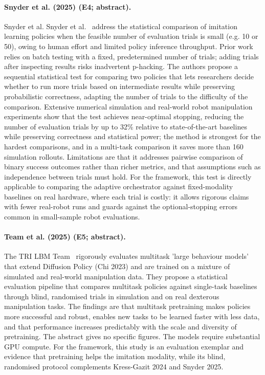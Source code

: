 \documentclass[10pt,a4paper]{article}
\begin{document}
\paragraph{Snyder et al. (2025) (E4; abstract).} Snyder et al. Snyder et al.~\cite{Snyder2025} address the statistical comparison of imitation learning policies when the feasible number of evaluation trials is small (e.g. 10 or 50), owing to human effort and limited policy inference throughput. Prior work relies on batch testing with a fixed, predetermined number of trials; adding trials after inspecting results risks inadvertent p-hacking. The authors propose a sequential statistical test for comparing two policies that lets researchers decide whether to run more trials based on intermediate results while preserving probabilistic correctness, adapting the number of trials to the difficulty of the comparison. Extensive numerical simulation and real-world robot manipulation experiments show that the test achieves near-optimal stopping, reducing the number of evaluation trials by up to 32\% relative to state-of-the-art baselines while preserving correctness and statistical power; the method is strongest for the hardest comparisons, and in a multi-task comparison it saves more than 160 simulation rollouts. Limitations are that it addresses pairwise comparison of binary success outcomes rather than richer metrics, and that assumptions such as independence between trials must hold. For the framework, this test is directly applicable to comparing the adaptive orchestrator against fixed-modality baselines on real hardware, where each trial is costly: it allows rigorous claims with fewer real-robot runs and guards against the optional-stopping errors common in small-sample robot evaluations.

\paragraph{Team et al. (2025) (E5; abstract).} The TRI LBM Team~\cite{TRI2025} rigorously evaluates multitask 'large behaviour models' that extend Diffusion Policy (Chi 2023) and are trained on a mixture of simulated and real-world manipulation data. They propose a statistical evaluation pipeline that compares multitask policies against single-task baselines through blind, randomised trials in simulation and on real dexterous manipulation tasks. The findings are that multitask pretraining makes policies more successful and robust, enables new tasks to be learned faster with less data, and that performance increases predictably with the scale and diversity of pretraining. The abstract gives no specific figures. The models require substantial GPU compute. For the framework, this study is an evaluation exemplar and evidence that pretraining helps the imitation modality, while its blind, randomised protocol complements Kress-Gazit 2024 and Snyder 2025.
\end{document}
